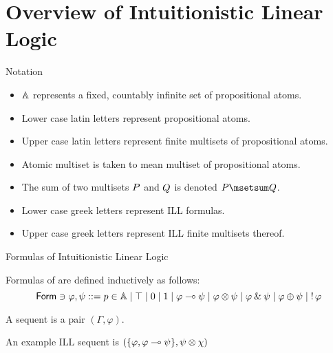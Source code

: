 \documentclass{beamer}
\begin{document}
\section{Overview of Intuitionistic Linear Logic}
\begin{frame}{Notation}
	\begin{itemize}%
		\item $\mathbb{A}$ represents a fixed, countably infinite set of propositional atoms. 
		\item Lower case latin letters represent propositional atoms.
		\item Upper case latin letters represent finite multisets of propositional atoms. 
		\item Atomic multiset is taken to mean multiset of propositional atoms.
		\item The sum of two multisets ${P}$ and ${Q}$ is denoted $\at{P}\msetsum\at{Q}$. 
		\item Lower case greek letters represent ILL formulas.
		\item Upper case greek letters represent ILL finite multisets thereof. 
	\end{itemize}
\end{frame}
\begin{frame}{Formulas of Intuitionistic Linear Logic}
	\begin{definition}
		Formulas of \ILL{} are defined inductively as follows: 
		\[
			\mathsf{Form} \ni \varphi, \psi ::= p \in \mathbb{A} \mid \top \mid 0 \mid 1 \mid \varphi \multimap \psi \mid \varphi \otimes \psi \mid \varphi \mathbin{\&} \psi \mid \varphi \oplus \psi \mid \mathop{!} \varphi
		\]
	\end{definition}
	\pause
	\begin{definition}[Sequent]
		A sequent is a pair $(\Gamma, \varphi)$.
	\end{definition}
	\pause
	\begin{center}
		An example ILL sequent is $(\{\varphi, \varphi \multimap \psi\}, \psi\otimes\chi)$
	\end{center}
\end{frame}
\end{document}
